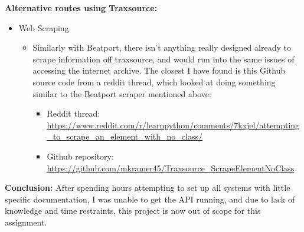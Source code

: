 \documentclass{article}
\begin{document}
\textbf{Alternative routes using Traxsource:}
\begin{itemize}
    \item Web Scraping
    \begin{itemize}
        \item Similarly with Beatport, there isn't anything really designed already to scrape information off traxsource, and would run into the same issues of accessing the internet archive. The closest I have found is this Github source code from a reddit thread, which looked at doing something similar to the Beatport scraper mentioned above:
        \begin{itemize}
            \item Reddit thread:\\ \url{https://www.reddit.com/r/learnpython/comments/7kxjel/attempting_to_scrape_an_element_with_no_class/}
            \item Github repository:\\
            \url{https://github.com/mkramer45/Traxsource_ScrapeElementNoClass}
        \end{itemize}
    \end{itemize}
\end{itemize}
\textbf{Conclusion:} After spending hours attempting to set up all systems with little specific documentation, I was unable to get the API running, and due to lack of knowledge and time restraints, this project is now out of scope for this assignment.
\end{document}

